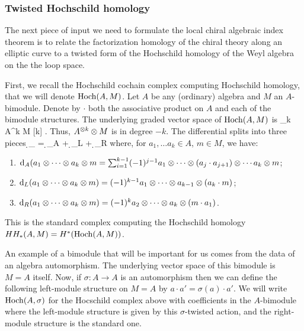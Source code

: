 \documentclass[10pt]{amsart}
\begin{document}
\subsubsection{Twisted Hochschild homology}

The next piece of input we need to formulate the local chiral algebraic index theorem is to relate the factorization homology of the chiral theory along an elliptic curve to a twisted form of the Hochschild homology of the Weyl algebra on the the loop space.

First, we recall the Hochschild cochain complex computing Hochschild homology, that we will denote ${\rm Hoch}(A,M)$. 
Let $A$ be any (ordinary) algebra and $M$ an $A$-bimodule. 
Denote by $\cdot$ both the associative product on $A$ and each of the bimodule structures.
The underlying graded vector space of ${\rm Hoch}(A, M)$ is
\ben
\oplus_k A^{\tensor k} \tensor M [k] .
\een
Thus, $A^{\otimes k} \otimes M$ is in degree $-k$. 
The differential splits into three pieces
\ben
\d_{\Hoch} = \d_A + \d_L + \d_R
\een
where, for $a_1,\ldots a_k \in A$, $m \in M$, we have:
\begin{enumerate}
\item ${\rm d}_A (a_1 \otimes \cdots \otimes a_k \otimes m = \sum_{i=1}^{k-1} (-1)^{j-1} a_1 \otimes \cdots \otimes (a_j \cdot a_{j+1}) \otimes \cdots a_k \otimes m$;
\item ${\rm d}_L (a_1\otimes \cdots \otimes a_k \otimes m) = (-1)^{k-1} a_1\otimes \cdots \otimes a_{k-1} \otimes (a_k \cdot m)$;
\item ${\rm d}_R (a_1\otimes \cdots \otimes a_k \otimes m) = (-1)^k a_2 \otimes \cdots \otimes a_k \otimes (m \cdot a_1)$.
\end{enumerate}
This is the standard complex computing the Hochschild homology $HH_*(A, M) = H^*({\rm Hoch}(A,M))$.

An example of a bimodule that will be important for us comes from the data of an algebra automorphism. 
The underlying vector space of this bimodule is $M = A$ itself.
Now, if $\sigma : A \to A$ is an automorphism then we can define the following left-module structure on $M = A$ by $a \cdot a' = \sigma(a) \cdot a'$. 
We will write ${\rm Hoch}(A, \sigma)$ for the Hocschild complex above with coefficients in the $A$-bimodule where the left-module structure is given by this $\sigma$-twisted action, and the right-module structure is the standard one.
\end{document}
